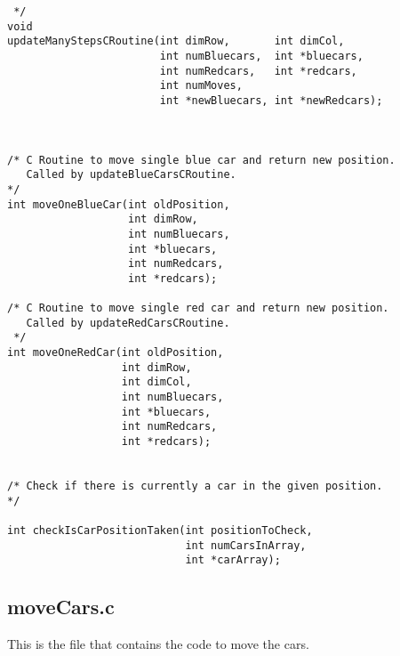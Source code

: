\documentclass[11pt]{article}
\begin{document}
\begin{verbatim}
 */
void
updateManyStepsCRoutine(int dimRow,       int dimCol,
                        int numBluecars,  int *bluecars,
                        int numRedcars,   int *redcars,
                        int numMoves,
                        int *newBluecars, int *newRedcars);



/* C Routine to move single blue car and return new position.
   Called by updateBlueCarsCRoutine.
*/
int moveOneBlueCar(int oldPosition,
                   int dimRow,
                   int numBluecars,
                   int *bluecars,
                   int numRedcars,
                   int *redcars);

/* C Routine to move single red car and return new position. 
   Called by updateRedCarsCRoutine.
 */
int moveOneRedCar(int oldPosition,
                  int dimRow,
                  int dimCol,
                  int numBluecars,
                  int *bluecars,
                  int numRedcars,
                  int *redcars);


/* Check if there is currently a car in the given position. 
*/

int checkIsCarPositionTaken(int positionToCheck,
                            int numCarsInArray,
                            int *carArray);
\end{verbatim}
\subsection{moveCars.c}
\label{sec-4-4}

   This is the file that contains the code to move the cars.
\end{document}
